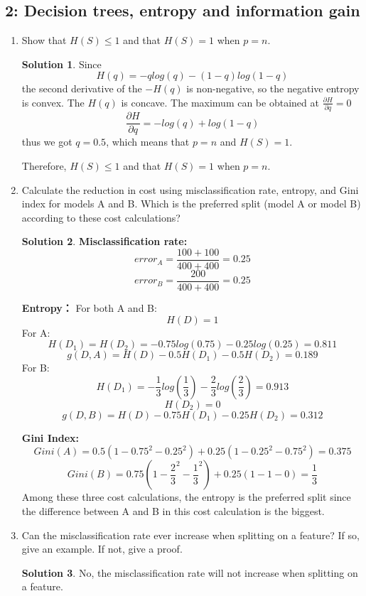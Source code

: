 \documentclass[]{book}
\theoremstyle{definition}
\newtheorem*{soln}{Solution}
\begin{document}
\subsection*{2: Decision trees, entropy and information gain }
	\begin{enumerate}
		\item  Show that $H(S) ≤ 1$ and that $H(S) = 1$ when $p = n$.
		\begin{soln}
			Since
			$$H(q) = - q log(q)- (1-q)log(1-q)$$
			the second derivative of the $-H(q)$ is non-negative, so the negative entropy is convex. The $H(q)$ is concave. The maximum can be obtained at $\frac{\partial H }{\partial q } = 0$
			$$\frac{\partial H }{\partial q } = -log(q) +log(1-q)$$
			thus we got $q = 0.5$, which means that $p = n$ and $H(S) = 1$.
			
			Therefore, $H(S) ≤ 1$ and that $H(S) = 1$ when $p = n$.
			
		\end{soln}
		\item Calculate the reduction in cost using misclassification rate, entropy, and Gini index for models A and B. Which is the preferred split (model A or model B) according to these cost calculations?
		\begin{soln}
			\textbf{Misclassification rate:}
			$$error_A = \frac{100 + 100 }{400+400} = 0.25$$
			$$error_B = \frac{200}{400+400} = 0.25$$ 
			
			\textbf{Entropy：} 
			For both A and B:
			$$H(D) = 1$$
			For A:
			$$H(D_1) =H(D_2) =  - 0.75 log(0.75) - 0.25log(0.25) = 0.811$$
			$$g(D,A) = H(D) -0.5H(D_1) - 0.5H(D_2) = 0.189$$
			For B:
			$$H(D_1) = - \frac{1}{3}log(\frac{1}{3}) - \frac{2}{3}log(\frac{2}{3}) = 0.913$$
			$$H(D_2)= 0$$
			$$g(D,B) = H(D)-0.75H(D_1)-0.25H(D_2) = 0.312$$
			
			\textbf{Gini Index:}
			$$Gini(A) = 0.5(1-0.75^2 - 0.25^2) + 0.25(1-0.25^2 - 0.75^2) = 0.375$$
			$$Gini(B) = 0.75(1-\frac{2}{3}^2 - \frac{1}{3}^2)+0.25(1-1-0)=\frac{1}{3}$$
			Among these three cost calculations, the entropy is the preferred split since the difference between A and B in this cost calculation is the biggest.
		\end{soln}
		\item Can the misclassification rate ever increase when splitting on a feature? If so, give an example. If not, give a proof.
		\begin{soln}
			No, the misclassification rate will not increase when splitting on a feature. 
		\end{soln}
	\end{enumerate}
\end{document}
